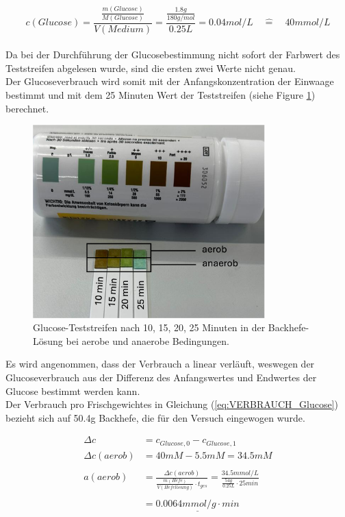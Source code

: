 \documentclass[10pt,a4paper]{article}
\begin{document}
			\begin{equation}\label{eq:Einwaage_Glucose}
				c(Glucose) = \frac{\frac{m(Glucose)}{M(Glucose)}}{V(Medium)} = \frac{\frac{1.8 g}{180 g/mol}}{0.25L} = 0.04 mol/L \quad\widehat{=} \quad 40 mmol/L
			\end{equation}
			\\
			Da bei der Durchführung der Glucosebestimmung nicht sofort der Farbwert des Teststreifen abgelesen wurde, sind die ersten zwei Werte nicht genau.\\
			Der Glucoseverbrauch wird somit mit der Anfangskonzentration der Einwaage bestimmt und mit dem 25 Minuten Wert der Teststreifen (siehe Figure \ref{fig: Glucoseverbrauch}) berechnet.
		
			\begin{figure}[H]
				\centering
				\includegraphics[width=0.8\textwidth]{Teststreifen.png}
				\caption{Glucose-Teststreifen nach 10, 15, 20, 25 Minuten in der Backhefe-Lösung bei aerobe und anaerobe Bedingungen.}
				\label{fig: Glucoseverbrauch}
			\end{figure}
		
			Es wird angenommen, dass der Verbrauch a linear verläuft, weswegen der Glucoseverbrauch aus der Differenz des Anfangswertes und Endwertes der Glucose bestimmt werden kann.\\
			Der Verbrauch pro Frischgewichtes in Gleichung (\ref{eq:VERBRAUCH_Glucose}) bezieht sich auf 50.4g Backhefe, die für den Versuch eingewogen wurde.
		
			\begin{equation}\label{eq:VERBRAUCH_Glucose}
				\begin{split}
					\Delta c &= c_{Glucose, 0} - c_{Glucose , 1}\\
					\Delta c(aerob) &= 40 mM - 5.5 mM = 34.5 mM\\
					\\
					a(aerob) &=	\frac{\Delta c(aerob)}{\frac{m(Hefe)}{V(Hefelösung)} \cdot t_{ges}} = \frac{34.5 mmol/L}{\frac{54g}{0.25L} \cdot 25 min} \\
					\\
					&= \underline{0.0064 mmol/ g \cdot min}\\
				\end{split}
			\end{equation}
		
\end{document}
